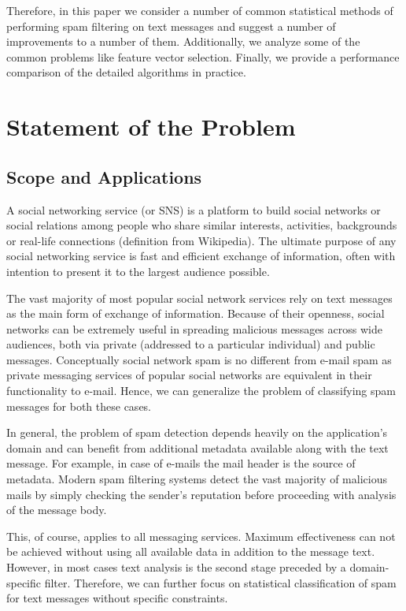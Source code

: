 \documentclass[12pt]{report}
\begin{document}
Therefore, in this paper we consider a number of common statistical methods of performing spam filtering on text messages and suggest a number of improvements to a number of them. Additionally, we analyze some of the common problems like feature vector selection. Finally, we provide a performance comparison of the detailed algorithms in practice.

\newpage


\chapter{Statement of the Problem}

\section{Scope and Applications}

A social networking service (or SNS) is a platform to build social networks or social relations among people who share similar interests, activities, backgrounds or real-life connections (definition from Wikipedia). The ultimate purpose of any social networking service is fast and efficient exchange of information, often with intention to present it to the largest audience possible.

The vast majority of most popular social network services rely on text messages as the main form of exchange of information. Because of their openness, social networks can be extremely useful in spreading malicious messages across wide audiences, both via private (addressed to a particular individual) and public messages. Conceptually social network spam is no different from e-mail spam as private messaging services of popular social networks are equivalent in their functionality to e-mail. Hence, we can generalize the problem of classifying spam messages for both these cases.

In general, the problem of spam detection depends heavily on the application's domain and can benefit from additional metadata available along with the text message. For example, in case of e-mails the mail header is the source of metadata. Modern spam filtering systems detect the vast majority of malicious mails by simply checking the sender's reputation before proceeding with analysis of the message body.

This, of course, applies to all messaging services. Maximum effectiveness can not be achieved without using all available data in addition to the message text. However, in most cases text analysis is the second stage preceded by a domain-specific filter. Therefore, we can further focus on statistical classification of spam for text messages without specific constraints.
\end{document}
